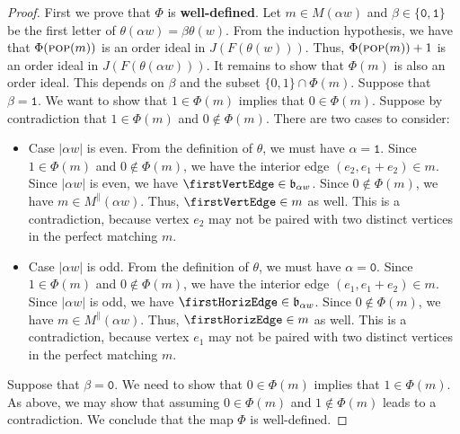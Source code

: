 \documentclass[a4paper,12pt]{amsart}
\newcommand{\bfrak}{{\mathfrak{b}}}
\newcommand{\0}{\mathtt{0}}
\newcommand{\1}{\mathtt{1}}
\newcommand{\2}{\mathtt{2}}
\newcommand{\3}{\mathtt{3}}
\newcommand{\carrevide}{{\parallel}}
\DeclareMathOperator{\pop}{\textsc{pop}}
\begin{document}
\begin{proof}
%
%
%


    First we prove that $\Phi$ is \textbf{well-defined}.
    Let $m\in M(\alpha w)$
    and $\beta\in\{\0,\1\}$ be the first letter of
    $\theta(\alpha w)=\beta\theta(w)$.
    From the induction hypothesis,
    we have that $\Phi(\pop(m))$ is an order ideal in $J(F(\theta(w)))$.
    Thus, $\Phi(\pop(m))+1$ is an order ideal in $J(F(\theta(\alpha w)))$.
    It remains to show that $\Phi(m)$ is also an order ideal.
    This depends on $\beta$ and the subset $\{0,1\}\cap\Phi(m)$.
    Suppose that $\beta=\1$.
    We want to show that $1\in\Phi(m)$ implies that $0\in\Phi(m)$.
    Suppose by contradiction that $1\in\Phi(m)$ and $0\notin\Phi(m)$.
    There are two cases to consider:
    \begin{itemize}
        \item Case $|\alpha w|$ is even.
            From the definition of $\theta$, we must have $\alpha=\1$.
            Since $1\in\Phi(m)$ and $0\notin\Phi(m)$, we have the interior edge
            $(e_2,e_1+e_2)\in m$.
            Since $|\alpha w|$ is even, we have $\firstVertEdge\in\bfrak_{\alpha w}$.
            Since $0\notin\Phi(m)$, we have $m\in M^\carrevide(\alpha w)$.
            Thus, $\firstVertEdge\in m$ as well.
            This is a contradiction, because vertex $e_2$ may not be paired
            with two distinct vertices in the perfect matching $m$.
        \item Case $|\alpha w|$ is odd.
            From the definition of $\theta$, we must have $\alpha=\0$.
            Since $1\in\Phi(m)$ and $0\notin\Phi(m)$, we have the interior edge
            $(e_1,e_1+e_2)\in m$.
            Since $|\alpha w|$ is odd, we have $\firstHorizEdge\in\bfrak_{\alpha w}$.
            Since $0\notin\Phi(m)$, we have $m\in M^\carrevide(\alpha w)$.
            Thus, $\firstHorizEdge\in m$ as well.
            This is a contradiction, because vertex $e_1$ may not be paired
            with two distinct vertices in the perfect matching $m$.
    \end{itemize}
    Suppose that $\beta=\0$.
    We need to show that $0\in\Phi(m)$ implies that $1\in\Phi(m)$.
    As above, we may show that assuming $0\in\Phi(m)$ and $1\notin\Phi(m)$
    leads to a contradiction.
    We conclude that the map $\Phi$ is well-defined.



\end{proof}
\end{document}
